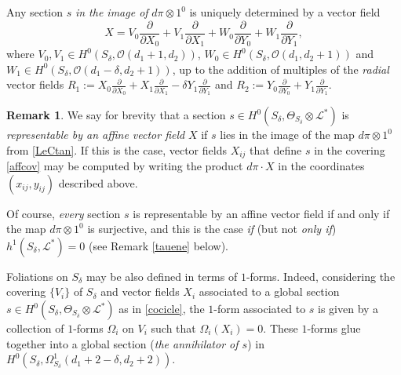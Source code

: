 \documentclass{amsart} %
\theoremstyle{definition}
\newtheorem{remark}[theorem]{Remark}
\newcommand{\cts}{\Theta_{S_{\delta}}}
\newcommand{\cs}{S_{\delta}}
\newcommand{\mcL}{\mathcal{L}}
\newcommand{\mcO}{\mathcal{O}}
\begin{document}
Any section $ s $ \emph{in the image of} $ {d \pi\otimes 1}^0 $ is uniquely determined by a
vector field
\begin{equation}\label{fields}
 X = V_0\frac{\partial}{\partial X_0}+V_1\frac{\partial}{\partial X_1}
     + W_0\frac{\partial}{\partial Y_0}+W_1\frac{\partial}{\partial Y_1},
\end{equation}
where
$ V_0, V_1 \in H^0(S_{\delta},\mcO(d_1+1,d_2)) $,
$ W_0 \in H^0(S_{\delta},\mcO(d_1,d_2+1))$ and
$ W_1 \in H^0(S_{\delta},\mcO(d_1-\delta,d_2+1))$,
up to the addition of multiples of the \emph{radial} vector fields
$R_1:=X_0\frac{\partial}{\partial X_0}+X_1\frac{\partial}{\partial X_1}
 -\delta Y_1\frac{\partial}{\partial Y_1}$ and
 $R_2:=Y_0\frac{\partial}{\partial Y_0}+Y_1\frac{\partial}{\partial Y_1}$.
\begin{remark}\label{RepByVF}
We say for brevity that a section
$ s \in H^{0}( S_{\delta}, \cts \otimes \mcL^{*}) $
is \emph{representable by an affine vector field} $X$
if $ s $ lies in the image of the map $ {d \pi\otimes 1}^0 $ from \eqref{LeCtan}.
If this is the case, vector fields $ X_{ij} $ that define $ s $ in the covering \eqref{affcov} may be computed by
writing the product $ d \pi \cdot X $ in the coordinates $(x_{ij},y_{ij})$ described above.%

Of course, \emph{every} section $ s $ is representable by an affine vector field if and only if the map
$ {d \pi\otimes 1}^0 $ is surjective, and this is the case \emph{if} (but not \emph{only if})
$ h^1(S_{\delta},{\mathcal L^*}) = 0 $ (see Remark \ref{tauene} below).
\end{remark}

Foliations on $ \cs $ may be also defined in terms of $1$-forms. Indeed, considering the covering
$ \{ V_i \} $ of $ \cs $ and vector fields $ X_i $ associated to a global section
$ s \in H^{0}( S_{\delta}, \cts \otimes \mcL^{*}) $ as in \eqref{cocicle}, the $1$-form associated to $ s $
is given by a collection of $1$-forms $ \Omega_i $ on $ V_i $ such that $ \Omega_i( X_ i ) = 0 $. These $1$-forms glue together into a global section (\emph{the annihilator of $ s $}) in
$ H^0( \cs, \Omega_{\cs}^1( d_1 + 2 - \delta, d_2 + 2) ) $.
\end{document}
